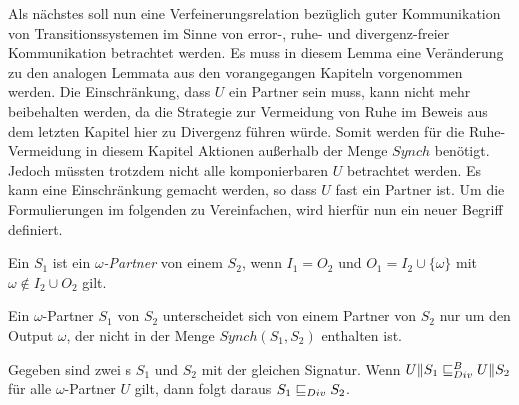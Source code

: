 Als nächstes soll nun eine Verfeinerungsrelation bezüglich guter Kommunikation
von Transitionssystemen im Sinne von error-, ruhe- und divergenz-freier
Kommunikation betrachtet werden. Es muss in diesem Lemma eine Veränderung zu
den analogen Lemmata aus den vorangegangen Kapiteln vorgenommen werden. Die
Einschränkung, dass $U$ ein Partner sein muss, kann nicht mehr beibehalten
werden, da die Strategie zur Vermeidung von Ruhe im Beweis aus dem letzten
Kapitel hier zu Divergenz führen würde. Somit werden für die Ruhe-Vermeidung in
diesem Kapitel Aktionen außerhalb der Menge $Synch$
benötigt. Jedoch müssten trotzdem nicht alle komponierbaren $U$ betrachtet
werden. Es kann eine Einschränkung gemacht werden, so dass $U$ fast ein
Partner ist. Um die Formulierungen im folgenden zu Vereinfachen, wird hierfür
nun ein neuer Begriff definiert.

\begin{Def}
  Ein \EIO{} $S_1$ ist ein \emph{$\omega$-Partner} von einem \EIO{} $S_2$, wenn
  $I_1=O_2$ und $O_1=I_2\cup\{\omega\}$ mit $\omega\notin I_2\cup O_2$ gilt.
\end{Def}

Ein $\omega$-Partner $S_1$ von $S_2$ unterscheidet sich von einem Partner von
$S_2$ nur um den Output $\omega$, der nicht in der Menge $Synch(S_1,S_2)$
enthalten ist.

\begin{lem}
\label{lemDivVerfeinerung}
  Gegeben sind zwei \EIO{}s $S_1$ und $S_2$ mit der gleichen Signatur. Wenn
  $U\|S_1\sqsubseteq _{Div}^B{} U\|S_2$ für alle $\omega$-Partner $U$ gilt, dann folgt daraus
  $S_1\sqsubseteq _{Div}{} S_2$.
\end{lem}

